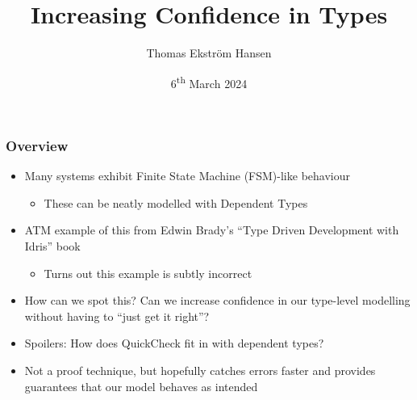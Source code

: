 \documentclass[compress,handout]{beamer}
\title{Increasing Confidence in Types}
\author{Thomas Ekstr{\" o}m Hansen}
\date{6\textsuperscript{th} March 2024}
\begin{document}
\maketitle


\begin{frame}
  \frametitle{Overview}

  \begin{itemize}
    \item<1-> Many systems exhibit Finite State Machine (FSM)-like behaviour
    \begin{itemize}
      \item<1-> These can be neatly modelled with Dependent Types
    \end{itemize}
    \item<2-> ATM example of this from Edwin Brady's ``Type Driven
              Development with Idris'' book
    \begin{itemize}
      \item<2-> Turns out this example is subtly incorrect
    \end{itemize}
    \item<3-> How can we spot this? Can we increase confidence in our type-level
              modelling without having to ``just get it right''?
    \item<4-> Spoilers: How does QuickCheck fit in with dependent types?
    \item<5-> Not a proof technique, but hopefully catches errors faster and
              provides guarantees that our model behaves as intended
  \end{itemize}

\end{frame}
\end{document}
